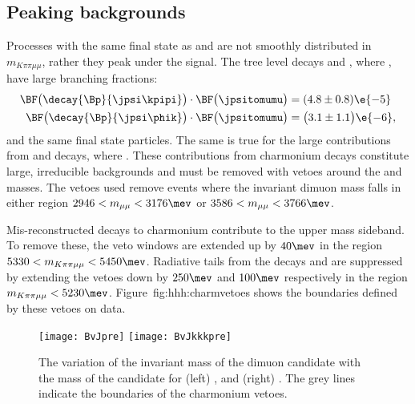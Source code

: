 \subsection{Peaking backgrounds}
Processes with the same final state as \btokpipimumu and \btophikmumu are not smoothly distributed
in $m_{K\pi\pi\mu\mu}$, rather they peak under the signal.
The tree level decays \decay{\Bp}{\jpsi\kpipi} and \decay{\Bp}{\jpsi\phik}, where
\decay{\jpsi}{\mumu}, have large branching fractions:
\begin{align}
  \BF\big(\decay{\Bp}{\jpsi\kpipi}\big)
  \cdot \BF\big(\jpsitomumu\big)
  &= (4.8 \pm 0.8)\e{-5} \\
  \BF\big(\decay{\Bp}{\jpsi\phik}\big)
  \cdot \BF\big(\jpsitomumu\big)
  &= \big(3.1 \pm 1.1\big)\e{-6},
\end{align}
and the same final state particles.
The same is true for the large contributions from \decay{\Bp}{\psitwos\kpipi} and
\decay{\Bp}{\psitwos\phik} decays, where \decay{\psitwos}{\mumu}.
These contributions from charmonium decays constitute large, irreducible backgrounds and must be
removed with vetoes around the \jpsi and \psitwos masses.
The vetoes used remove events where the invariant dimuon mass falls in either region
$2946<m_{\mu\mu}<3176\mev$ or $3586<m_{\mu\mu}<3766\mev$.

Mis-reconstructed decays to charmonium contribute to the upper mass sideband.
To remove these, the veto windows are extended up by $40\mev$ in the region
$5330<m_{K\pi\pi\mu\mu}<5450\mev$.
Radiative tails from the decays \decay{\jpsi}{\mumu\gamma} and \decay{\psitwos}{\mumu\gamma} are
suppressed by extending the vetoes down by $250\mev$ and $100\mev$ respectively in the region
$m_{K\pi\pi\mu\mu}<5230\mev$.
Figure~{fig:hhh:charmvetoes} shows the boundaries defined by these vetoes on data.


\begin{figure}
  \begin{center}
    \texttt{[image: BvJpre]}
    \texttt{[image: BvJkkkpre]}
    \caption[Charmonium vetoes]
    {\small
      The variation of the invariant mass of the dimuon candidate with the mass of the \Bp
      candidate for
      (left) \btokpipimumu, and
      (right) \btophikmumu.
      The grey lines indicate the boundaries of the charmonium vetoes.
    }
    \label{fig:hhh:charmvetoes}
  \end{center}
\end{figure}

